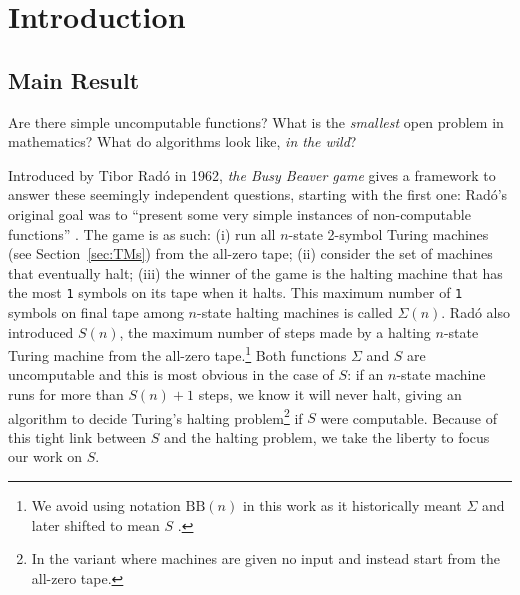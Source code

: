 \documentclass[a4paper,british]{article}
\theoremstyle{definition} %
\numberwithin{equation}{section}
\theoremstyle{definition} %
\newcommand{\sone}{\texttt{1}\xspace}
\newcommand{\radofull}{Tibor Rad\'o\xspace}
\newcommand{\rado}{Rad\'o\xspace}
\begin{document}
\section{Introduction}\label{sec:intro}

\subsection{Main Result}\label{sec:intro:mainresults}

\newcommand{\noncomput}{uncomputable\xspace}
\newcommand{\BBfull}{Busy Beaver\xspace}
\newcommand{\Coq}{Coq\xspace}
\newcommand{\CoqProofReleaseURL}{\url{https://github.com/ccz181078/Coq-BB5}}

\newcommand{\ie}{i.e.~}
\newcommand{\eg}{e.g.~}

Are there simple \noncomput functions? What is the \textit{smallest} open problem in mathematics? What do algorithms look like, \textit{in the wild}?

Introduced by \radofull in 1962, \textit{the \BBfull game} gives a framework to answer these seemingly independent questions, starting with the first one: \rado's original goal was to ``present some very simple instances of non-computable functions'' \cite{Rado_1962}. The game is as such: (i) run all $n$-state 2-symbol Turing machines (see Section~\ref{sec:TMs}) from the all-zero tape; (ii) consider the set of machines that eventually halt; (iii) the winner of the game is the halting machine that has the most \sone symbols on its tape when it halts. This maximum number of \sone symbols on final tape among $n$-state halting machines is called $\Sigma(n)$. \rado also introduced $S(n)$, the maximum number of steps made by a halting $n$-state Turing machine from the all-zero tape.\footnote{We avoid using notation $\text{BB}(n)$ in this work as it historically meant $\Sigma$ \cite{Rado_1962, 10.5555/1151785.1151794} and later shifted to mean $S$ \cite{BusyBeaverFrontier,sterin_2022_14955828}.} Both functions $\Sigma$ and $S$ are \noncomput and this is most obvious in the case of $S$: if an $n$-state machine runs for more than $S(n)+1$ steps, we know it will never halt, giving an algorithm to decide Turing's halting problem\footnote{In the variant where machines are given no input and instead start from the all-zero tape.} if $S$ were computable. Because of this tight link between $S$ and the halting problem, we take the liberty to focus our work on $S$.
\end{document}
